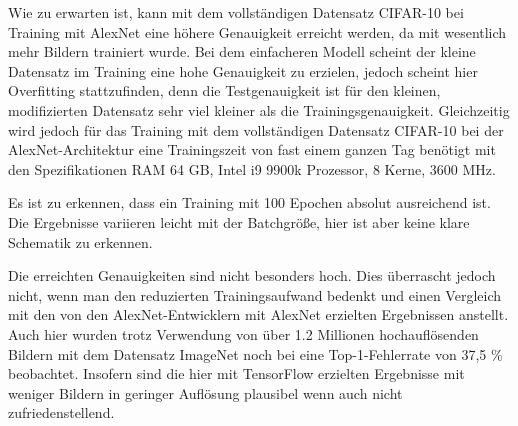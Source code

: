 Wie zu erwarten ist, kann mit dem vollständigen Datensatz CIFAR-10 bei Training mit AlexNet eine höhere Genauigkeit erreicht werden, da mit wesentlich mehr Bildern trainiert wurde. Bei dem einfacheren Modell scheint der kleine Datensatz im Training eine hohe Genauigkeit zu erzielen, jedoch scheint hier Overfitting stattzufinden, denn die Testgenauigkeit ist für den kleinen, modifizierten Datensatz sehr viel kleiner als die Trainingsgenauigkeit. Gleichzeitig wird jedoch für das Training mit dem vollständigen Datensatz CIFAR-10 bei der AlexNet-Architektur eine Trainingszeit von fast einem ganzen Tag benötigt mit den Spezifikationen RAM 64 GB, Intel i9 9900k Prozessor, 8 Kerne, 3600 MHz.

Es ist zu erkennen, dass ein Training mit 100 Epochen absolut ausreichend ist. Die Ergebnisse variieren leicht mit der Batchgröße, hier ist aber keine klare Schematik zu erkennen.

Die erreichten Genauigkeiten sind nicht besonders hoch. Dies überrascht jedoch nicht, wenn man den reduzierten Trainingsaufwand bedenkt und einen Vergleich mit den von den AlexNet-Entwicklern mit AlexNet erzielten Ergebnissen anstellt. Auch hier wurden trotz Verwendung von über 1.2 Millionen hochauflösenden Bildern mit dem Datensatz ImageNet noch bei eine Top-1-Fehlerrate von 37,5 \% beobachtet. Insofern sind die hier mit TensorFlow erzielten Ergebnisse mit weniger Bildern in geringer Auflösung plausibel wenn auch nicht zufriedenstellend.

